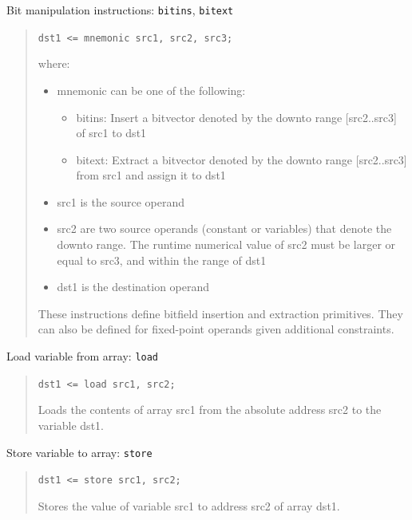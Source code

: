 \documentclass[a4paper]{article}
\begin{document}
Bit manipulation instructions: \texttt{bitins}, \texttt{bitext}
%
\begin{quote}

\texttt{dst1 <= mnemonic src1, src2, src3;}

where:
%
\begin{itemize}

\item mnemonic can be one of the following:
%
\begin{itemize}

\item bitins: Insert a bitvector denoted by the downto range {[}src2..src3{]} of src1
to dst1

\item bitext: Extract a bitvector denoted by the downto range {[}src2..src3{]} from
src1 and assign it to dst1

\end{itemize}

\item src1 is the source operand

\item src2 are two source operands (constant or variables) that denote the downto
range. The runtime numerical value of src2 must be larger or equal to src3,
and within the range of dst1

\item dst1 is the destination operand

\end{itemize}

These instructions define bitfield insertion and extraction primitives. They
can also be defined for fixed-point operands given additional constraints.

\end{quote}

Load variable from array: \texttt{load}
%
\begin{quote}

\texttt{dst1 <= load src1, src2;}

Loads the contents of array src1 from the absolute address src2 to the
variable dst1.

\end{quote}

Store variable to array: \texttt{store}
%
\begin{quote}

\texttt{dst1 <= store src1, src2;}

Stores the value of variable src1 to address src2 of array dst1.

\end{quote}
\end{document}
